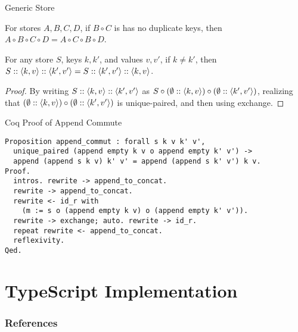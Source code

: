 \begin{frame}[allowframebreaks]{Generic Store}
    \begin{theorem}[Exchange]
    For stores $A, B, C, D$, if $B \circ C$ is has no duplicate keys, then $A \circ B \circ C \circ D = A \circ C \circ B \circ D$.
    \end{theorem}
    
    \begin{corollary}
    For any store $S$, keys $k, k'$, and values $v, v'$, if $k \not= k'$, then $S :: \left\langle k, v \right\rangle :: \left\langle k', v' \right\rangle = S :: \left\langle k', v' \right\rangle :: \left\langle k, v \right\rangle$.
    \end{corollary}
    \begin{proof}
    By writing $S :: \left\langle k, v \right\rangle :: \left\langle k', v' \right\rangle$ as $S \circ (\emptyset :: \left\langle k, v \right\rangle) \circ (\emptyset :: \left\langle k', v' \right\rangle)$, realizing that $(\emptyset :: \left\langle k, v \right\rangle) \circ (\emptyset :: \left\langle k', v' \right\rangle)$ is unique-paired, and then using exchange.
    \end{proof}
\end{frame}

\begin{frame}[fragile]{Coq Proof of Append Commute}
    \begin{verbatim}
Proposition append_commut : forall s k v k' v',
  unique_paired (append empty k v o append empty k' v') ->
  append (append s k v) k' v' = append (append s k' v') k v.
Proof.
  intros. rewrite -> append_to_concat.
  rewrite -> append_to_concat.
  rewrite <- id_r with
    (m := s o (append empty k v) o (append empty k' v')).
  rewrite -> exchange; auto. rewrite -> id_r.
  repeat rewrite <- append_to_concat.
  reflexivity.
Qed.
    \end{verbatim}
\end{frame}

\section{TypeScript Implementation}

\begin{frame}[t,allowframebreaks]
\nocite{*}
\frametitle{References}


\end{frame}
